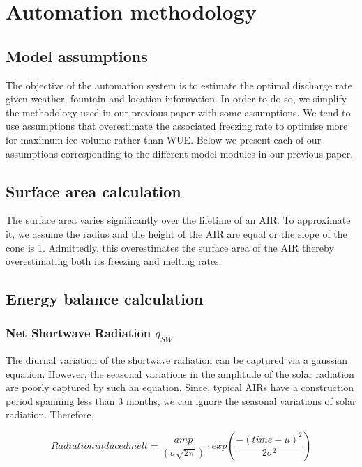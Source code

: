 \documentclass[utf8]{frontiersSCNS}
\begin{document}
\section{Automation methodology}
\subsection{Model assumptions}

The objective of the automation system is to estimate the optimal discharge rate given weather, fountain and
location information. In order to do so, we simplify the methodology used in our previous paper with some
assumptions. We tend to use assumptions that overestimate the associated freezing rate to optimise more for
maximum ice volume rather than WUE. Below we present each of our assumptions corresponding to the different
model modules in our previous paper.

\subsection{Surface area calculation} \label{sec:shape}

The surface area varies significantly over the lifetime of an AIR. To approximate it, we assume the radius and
the height of the AIR are equal or the slope of the cone is 1. Admittedly, this overestimates the surface area
of the AIR thereby overestimating both its freezing and melting rates. 

\subsection{Energy balance calculation} \label{sec:energy}

\subsubsection{Net Shortwave Radiation \texorpdfstring{$q_{SW}$}{Lg}} \label{sec:SW}
The diurnal variation of the shortwave radiation can be captured via a gaussian equation. However, the seasonal
variations in the amplitude of the solar radiation are poorly captured by such an equation. Since, typical AIRs
have a construction period spanning less than 3 months, we can ignore the seasonal variations of solar
radiation. Therefore, 

\begin{equation}
	Radiation induced melt = \frac{amp}{(\sigma \sqrt{2\pi})} \cdot exp\left(\frac{-(time-\mu)^2}{2\sigma^2}\right)
	\label{eqn:auto}
\end{equation}
\end{document}
